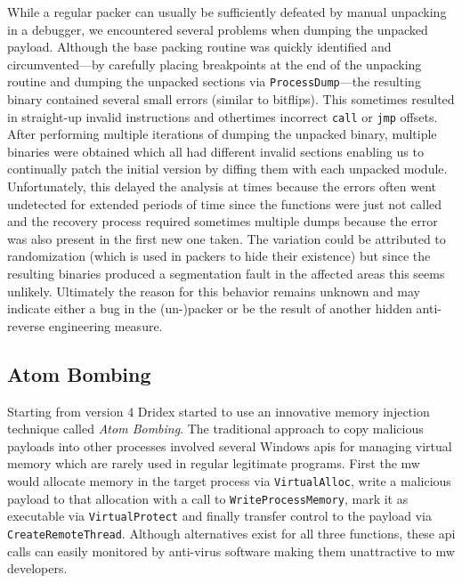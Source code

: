 While a regular packer can usually be sufficiently defeated by manual unpacking in a debugger, we encountered several problems when dumping the unpacked payload.
Although the base packing routine was quickly identified and circumvented---by carefully placing breakpoints at the end of the unpacking routine and dumping the unpacked sections via \lstinline|ProcessDump|---the resulting binary contained several small errors (similar to bitflips).
This sometimes resulted in straight-up invalid instructions and othertimes incorrect \lstinline|call| or \lstinline|jmp| offsets.
After performing multiple iterations of dumping the unpacked binary, multiple binaries were obtained which all had different invalid sections enabling us to continually patch the initial version by diffing them with each unpacked module.
Unfortunately, this delayed the analysis at times because the errors often went undetected for extended periods of time since the functions were just not called and the recovery process required sometimes multiple dumps because the error was also present in the first new one taken.
The variation could be attributed to randomization (which is used in packers to hide their existence) but since the resulting binaries produced a segmentation fault in the affected areas this seems unlikely.
Ultimately the reason for this behavior remains unknown and may indicate either a bug in the (un-)packer or be the result of another hidden anti-reverse engineering measure.

\subsection{Atom Bombing\label{subsec:Reverse_engineering_Dridex::Obfuscation_measures::Atom_Bombing}}
Starting from version 4 Dridex started to use an innovative memory injection technique called \emph{Atom Bombing}.
The traditional approach to copy malicious payloads into other processes involved several Windows \glspl{api} for managing virtual memory which are rarely used in regular legitimate programs.
First the \gls{mw} would allocate memory in the target process via \lstinline|VirtualAlloc|, write a malicious payload to that allocation with a call to \lstinline|WriteProcessMemory|, mark it as executable via \lstinline|VirtualProtect| and finally transfer control to the payload via \lstinline|CreateRemoteThread|.
Although alternatives exist for all three functions, these \gls{api} calls can easily monitored by anti-virus software making them unattractive to \gls{mw} developers.

